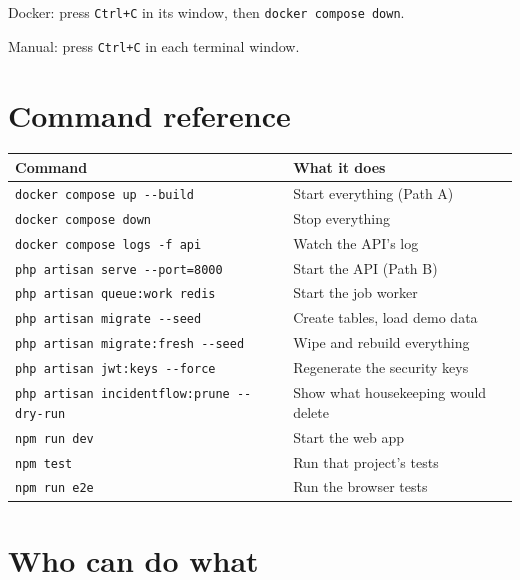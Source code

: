 \documentclass[11pt,a4paper]{article}
\newcommand{\cmd}[1]{\texttt{\small #1}}
\begin{document}
Docker: press \cmd{Ctrl+C} in its window, then \cmd{docker compose down}.

Manual: press \cmd{Ctrl+C} in each terminal window.

\newpage
\appendix
\section{Command reference}

\begin{center}
\begin{tabular}{@{}>{\raggedright\arraybackslash}p{8.6cm}>{\raggedright\arraybackslash}p{7cm}@{}}
\toprule
\textbf{Command} & \textbf{What it does} \\
\midrule
\texttt{docker compose up -{}-build} & Start everything (Path A) \\
\texttt{docker compose down} & Stop everything \\
\texttt{docker compose logs -f api} & Watch the API's log \\
\midrule
\texttt{php artisan serve -{}-port=8000} & Start the API (Path B) \\
\texttt{php artisan queue:work redis} & Start the job worker \\
\texttt{php artisan migrate -{}-seed} & Create tables, load demo data \\
\texttt{php artisan migrate:fresh -{}-seed} & Wipe and rebuild everything \\
\texttt{php artisan jwt:keys -{}-force} & Regenerate the security keys \\
\texttt{php artisan incidentflow:prune -{}-dry-run} & Show what housekeeping would delete \\
\midrule
\texttt{npm run dev} & Start the web app \\
\texttt{npm test} & Run that project's tests \\
\texttt{npm run e2e} & Run the browser tests \\
\bottomrule
\end{tabular}
\end{center}

\section{Who can do what}
\end{document}
